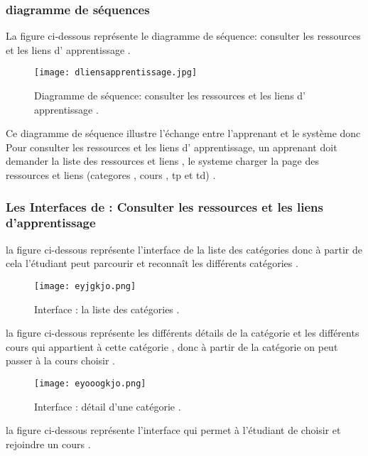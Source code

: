 \subsubsection{diagramme de séquences }
La figure  ci-dessous représente le diagramme de séquence: consulter les ressources et les liens d' apprentissage .

\begin{figure}[ht]
	\centering
	\texttt{[image: dliensapprentissage.jpg]}
	\caption{Diagramme de séquence: consulter les ressources et les liens d' apprentissage .}
	\label{fig:diagramme de séquence: consulter les ressources et les liens d' apprentissage }
\end{figure}
\FloatBarrier

Ce diagramme de séquence illustre l’échange entre l'apprenant et le système  donc Pour consulter les ressources et les liens d' apprentissage, un apprenant doit demander la liste des ressources et liens , le systeme charger la page des ressources et liens  (categores , cours , tp et td) .

\subsubsection{Les Interfaces de : Consulter les ressources et les liens d'apprentissage  }

la figure ci-dessous représente l'interface de la liste des catégories donc à partir de cela l'étudiant peut  parcourir et reconnaît les différents catégories .
\begin{figure}[ht]
	\centering
	\texttt{[image: eyjgkjo.png]}
	\caption{Interface : la liste des catégories .}
	\label{fig:Interface : la liste des catégories }
\end{figure}
\FloatBarrier
\bigskip
\bigskip
\bigskip
la figure ci-dessous représente les différents détails de la catégorie et les différents cours qui appartient à cette catégorie  , donc à partir de la catégorie on peut passer à la cours choisir .
\begin{figure}[ht]
	\centering
	\texttt{[image: eyooogkjo.png]}
	\caption{Interface : détail d'une catégorie .}
	\label{fig:Interface : détail d'une catégorie }
\end{figure}
\FloatBarrier
\clearpage
la figure ci-dessous représente l'interface qui permet à l'étudiant de choisir et rejoindre un cours .

